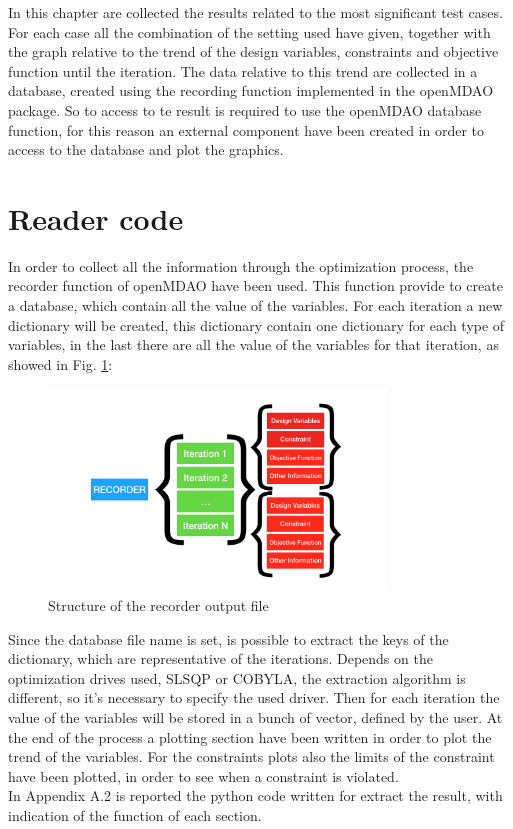 In this chapter are collected the results related to the most significant test cases. For each case all the combination of the setting used have given, together with the graph relative to the trend of the design variables, constraints and objective function until the iteration. The data relative to this trend are collected in a database, created using the recording function implemented in the openMDAO package. So to access to te result is required to use the openMDAO database function, for this reason an external component have been created in order to access to the database and plot the graphics.
\section{Reader code}
In order to collect all the information through the optimization process, the recorder function of openMDAO have been used. This function provide to create a database, which contain all the value of the variables. For each iteration a new dictionary will be created, this dictionary contain one dictionary for each type of variables, in the last there are all the value of the variables for that iteration, as showed in Fig. \ref{fig:6_1}:
\begin{figure}[H]
	\centering
	\includegraphics[width = 0.8\textwidth]{./Immagini/6_1.png}
	\caption{Structure of the recorder output file}
	\label{fig:6_1}
\end{figure}
Since the database file name is set, is possible to extract the keys of the dictionary, which are representative of the iterations. Depends on the optimization drives used, SLSQP or COBYLA, the extraction algorithm is different, so it's necessary to specify the used driver. Then for each iteration the value of the variables will be stored in a bunch of vector, defined by the user. At the end of the process a plotting section have been written in order to plot the trend of the variables. For the constraints plots also the limits of the constraint have been plotted, in order to see when a constraint is violated.\\
In Appendix A.2 is reported the python code written for extract the result, with indication of the function of each section.
